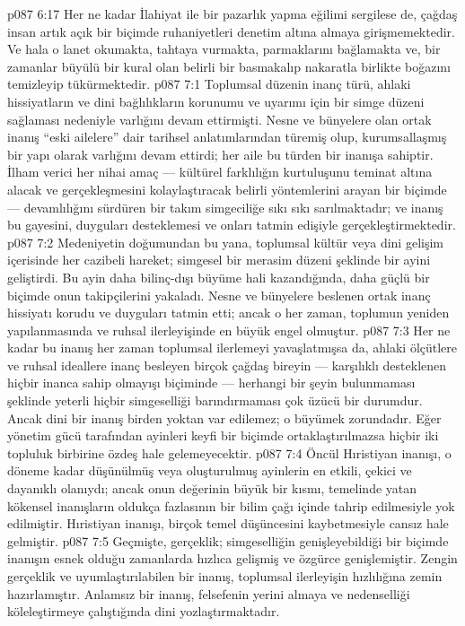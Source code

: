 \vs p087 6:17 Her ne kadar İlahiyat ile bir pazarlık yapma eğilimi sergilese de, çağdaş insan artık açık bir biçimde ruhaniyetleri denetim altına almaya girişmemektedir. Ve hala o lanet okumakta, tahtaya vurmakta, parmaklarını bağlamakta ve, bir zamanlar büyülü bir kural olan belirli bir basmakalıp nakaratla birlikte boğazını temizleyip tükürmektedir.
\vs p087 7:1 Toplumsal düzenin inanç türü, ahlaki hissiyatların ve dini bağlılıkların korunumu ve uyarımı için bir simge düzeni sağlaması nedeniyle varlığını devam ettirmişti. Nesne ve bünyelere olan ortak inanış “eski ailelere” dair tarihsel anlatımlarından türemiş olup, kurumsallaşmış bir yapı olarak varlığını devam ettirdi; her aile bu türden bir inanışa sahiptir. İlham verici her nihai amaç --- kültürel farklılığın kurtuluşunu teminat altına alacak ve gerçekleşmesini kolaylaştıracak belirli yöntemlerini arayan bir biçimde --- devamlılığını sürdüren bir takım simgeciliğe sıkı sıkı sarılmaktadır; ve inanış bu gayesini, duyguları desteklemesi ve onları tatmin edişiyle gerçekleştirmektedir.
\vs p087 7:2 Medeniyetin doğumundan bu yana, toplumsal kültür veya dini gelişim içerisinde her cazibeli hareket; simgesel bir merasim düzeni şeklinde bir ayini geliştirdi. Bu ayin daha bilinç\hyp{}dışı büyüme hali kazandığında, daha güçlü bir biçimde onun takipçilerini yakaladı. Nesne ve bünyelere beslenen ortak inanç hissiyatı korudu ve duyguları tatmin etti; ancak o her zaman, toplumun yeniden yapılanmasında ve ruhsal ilerleyişinde en büyük engel olmuştur.
\vs p087 7:3 Her ne kadar bu inanış her zaman toplumsal ilerlemeyi yavaşlatmışsa da, ahlaki ölçütlere ve ruhsal ideallere inanç besleyen birçok çağdaş bireyin --- karşılıklı desteklenen hiçbir inanca sahip olmayışı biçiminde ---  herhangi bir şeyin bulunmaması şeklinde yeterli hiçbir simgeselliği barındırmaması çok üzücü bir durumdur. Ancak dini bir inanış birden yoktan var edilemez; o büyümek zorundadır. Eğer yönetim gücü tarafından ayinleri keyfi bir biçimde ortaklaştırılmazsa hiçbir iki topluluk birbirine özdeş hale gelemeyecektir.
\vs p087 7:4 Öncül Hıristiyan inanışı, o döneme kadar düşünülmüş veya oluşturulmuş ayinlerin en etkili, çekici ve dayanıklı olanıydı; ancak onun değerinin büyük bir kısmı, temelinde yatan kökensel inanışların oldukça fazlasının bir bilim çağı içinde tahrip edilmesiyle yok edilmiştir. Hıristiyan inanışı, birçok temel düşüncesini kaybetmesiyle cansız hale gelmiştir.
\vs p087 7:5 Geçmişte, gerçeklik; simgeselliğin genişleyebildiği bir biçimde inanışın esnek olduğu zamanlarda hızlıca gelişmiş ve özgürce genişlemiştir. Zengin gerçeklik ve uyumlaştırılabilen bir inanış, toplumsal ilerleyişin hızlılığına zemin hazırlamıştır. Anlamsız bir inanış, felsefenin yerini almaya ve nedenselliği köleleştirmeye çalıştığında dini yozlaştırmaktadır.
